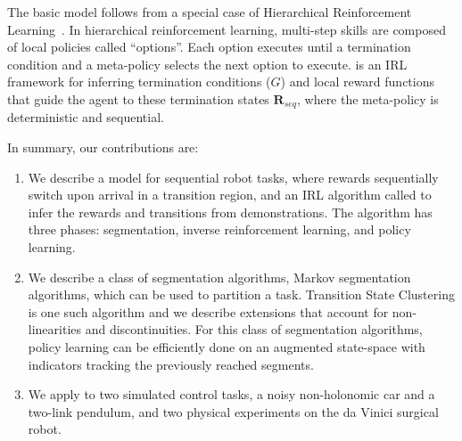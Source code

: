 The basic model follows from a special case of Hierarchical Reinforcement Learning~\cite{suttonPS99}.
In hierarchical reinforcement learning, multi-step skills are composed of local policies called ``options''. Each option executes until a termination condition and a meta-policy selects the next option to execute.
\hirl is an IRL framework for inferring termination conditions ($G$) and local reward functions that guide the agent to these termination states $\mathbf{R}_{seq}$, where the meta-policy is deterministic and sequential.


In summary, our contributions are:
\begin{enumerate}
\item We describe a model for sequential robot tasks, where rewards sequentially switch upon arrival in a transition region, and an IRL algorithm called \hirlfull to infer the rewards and transitions from demonstrations. The algorithm has three phases: segmentation, inverse reinforcement learning, and policy learning.
\item We describe a class of segmentation algorithms, Markov segmentation algorithms, which can be used to partition a task. Transition State Clustering is one such algorithm and we describe extensions that account for non-linearities and discontinuities. For this class of segmentation algorithms, policy learning can be efficiently done on an augmented state-space with indicators tracking the previously reached segments.
\item We apply \hirl to two simulated control tasks, a noisy non-holonomic car and a two-link pendulum, and two physical experiments on the da Vinici surgical robot.
\end{enumerate}


